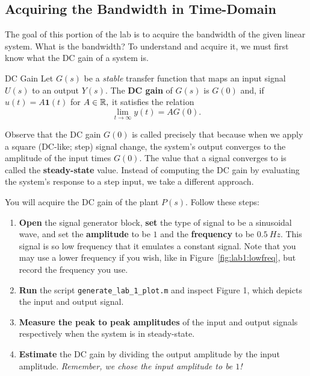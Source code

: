 \subsection{Acquiring the Bandwidth in Time-Domain}
The goal of this portion of the lab is to acquire the bandwidth of the
given linear system. What is the bandwidth? To understand and acquire it,
we must first know what the DC gain of a system is.
%
\begin{definition}[label={def:lab1:dcgain}]{DC Gain}
  Let \(G(s)\) be a \emph{stable} transfer function
  that maps an input signal \(U(s)\) to an
  output \(Y(s).\) The \textbf{DC gain} of \(G(s)\) is \(G(0)\) and,
  if \(u(t) = A \mathbf{1}(t)\) for \(A \in \mathbb{R},\) it satisfies the relation
  \[
    \lim_{t\to \infty} y(t) = A G(0).
  \]
\end{definition}
%
Observe that the DC gain \(G(0)\) is called precisely that because when we
apply a square (DC-like; step) signal change, the system's output converges
to the amplitude of the input times \(G(0).\)
The value that a signal converges to is called the \textbf{steady-state} value.
%
Instead of computing the DC gain by evaluating the system's response to a step
input, we take a different approach.
%
\begin{procedure}[label={proc:lab1:p1}]
  You will acquire the DC gain of the plant \(P(s)\). Follow these steps:
  \begin{enumerate}[label=(\arabic*)]
    \item{
      \textbf{Open} the signal generator block, \textbf{set} the type of signal
      to be a sinusoidal wave, and set the
      \textbf{amplitude} to be \(1\) and the \textbf{frequency}
      to be \(\SI{0.5}{Hz}.\) This signal is so low frequency that it
      emulates a constant signal. Note that you may use a lower frequency if
      you wish, like in Figure~\ref{fig:lab1:lowfreq}, but record the frequency
      you use.
    }
    \item{
      \textbf{Run} the script \texttt{generate\_lab\_1\_plot.m} and inspect
      Figure 1, which depicts the input and output signal.
    }
    \item{
      \textbf{Measure the peak to peak amplitudes} of the input and output signals respectively when the system is in steady-state.
    }
    \item{
      \textbf{Estimate} the DC gain by dividing the output amplitude
      by the input amplitude. \emph{Remember, we chose the input amplitude
      to be \(1\)!}
    }
  \end{enumerate}
\end{procedure}
